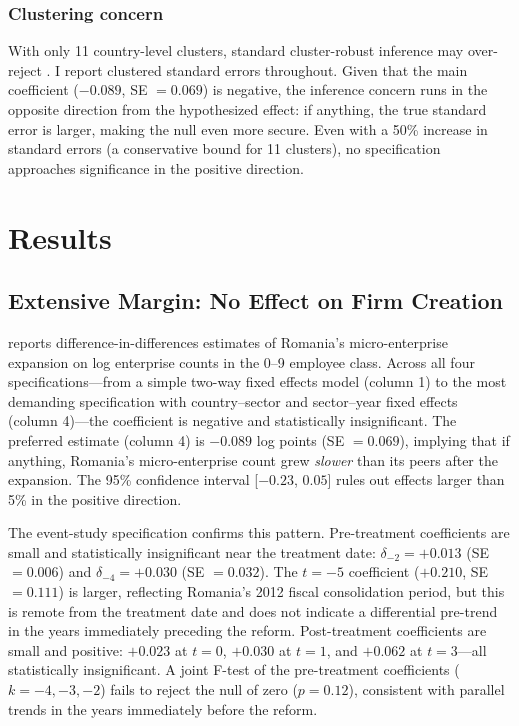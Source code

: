 \documentclass[12pt]{article}
\begin{document}
\subsubsection*{Clustering concern} With only 11 country-level clusters, standard cluster-robust inference may over-reject \citep{cameron2008bootstrap}. I report clustered standard errors throughout. Given that the main coefficient ($-0.089$, SE $= 0.069$) is negative, the inference concern runs in the opposite direction from the hypothesized effect: if anything, the true standard error is larger, making the null even more secure. Even with a 50\% increase in standard errors (a conservative bound for 11 clusters), no specification approaches significance in the positive direction.


\section{Results}
\label{sec:results}

\subsection{Extensive Margin: No Effect on Firm Creation}



 reports difference-in-differences estimates of Romania's micro-enterprise expansion on log enterprise counts in the 0--9 employee class. Across all four specifications---from a simple two-way fixed effects model (column 1) to the most demanding specification with country--sector and sector--year fixed effects (column 4)---the coefficient is negative and statistically insignificant. The preferred estimate (column 4) is $-0.089$ log points (SE $= 0.069$), implying that if anything, Romania's micro-enterprise count grew \textit{slower} than its peers after the expansion. The 95\% confidence interval [$-0.23$, $0.05$] rules out effects larger than 5\% in the positive direction.

The event-study specification confirms this pattern. Pre-treatment coefficients are small and statistically insignificant near the treatment date: $\delta_{-2} = +0.013$ (SE $= 0.006$) and $\delta_{-4} = +0.030$ (SE $= 0.032$). The $t = -5$ coefficient ($+0.210$, SE $= 0.111$) is larger, reflecting Romania's 2012 fiscal consolidation period, but this is remote from the treatment date and does not indicate a differential pre-trend in the years immediately preceding the reform. Post-treatment coefficients are small and positive: $+0.023$ at $t = 0$, $+0.030$ at $t = 1$, and $+0.062$ at $t = 3$---all statistically insignificant. A joint F-test of the pre-treatment coefficients ($k = -4, -3, -2$) fails to reject the null of zero ($p = 0.12$), consistent with parallel trends in the years immediately before the reform.
\end{document}
